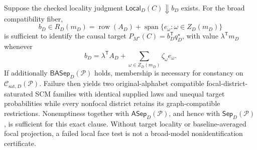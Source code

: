 Suppose the checked locality judgment \(\mathsf{Local}_D(C)\Downarrow b_D\) exists.  For the broad compatibility fiber,
\[
b_D\in R_D(m_D)
=\operatorname{row}(A_D)+\operatorname{span}\{e_\omega:\omega\in Z_D(m_D)\}
\]
is sufficient to identify the causal target \(P_{M^\star}(C)=b_D^{\mathsf T}q_D^\star\), with value \(\lambda^{\mathsf T}m_D\) whenever
\[
b_D=\lambda^{\mathsf T}A_D+
\sum_{\omega\in Z_D(m_D)}\zeta_\omega e_\omega.
\]
If additionally \(\mathsf{BASep}_D(\mathcal P)\) holds, membership is necessary for constancy on \(\mathcal C_{\mathrm{sat},D}(\mathcal P)\).  Failure then yields two original-alphabet compatible focal-district-saturated SCM families with identical supplied laws and unequal target probabilities while every nonfocal district retains its graph-compatible restrictions.  Nonemptiness together with \(\mathsf{ASep}_D(\mathcal P)\), and hence with \(\mathsf{Sep}_D(\mathcal P)\), is sufficient for this exact clause.  Without target locality or baseline-averaged focal projection, a failed local face test is not a broad-model nonidentification certificate.